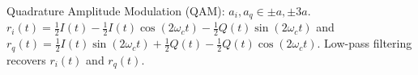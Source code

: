 \documentclass[8pt]{extarticle}
\begin{document}
\begin{multicols*}{3}
\begin{center}
Quadrature Amplitude Modulation (QAM): \( a_i, a_q \in \pm a, \pm 3a \). \( r_i(t) = \frac{1}{2}I(t) - \frac{1}{2}I(t)\cos{\left( 2\omega_c t \right)} - \frac{1}{2}Q(t)\sin{\left( 2\omega_c t \right)} \) and \( r_q(t) = \frac{1}{2}I(t)\sin{\left( 2\omega_c t \right)} + \frac{1}{2}Q(t) - \frac{1}{2}Q(t)\cos{\left( 2\omega_c t \right)} \). Low-pass filtering recovers \( r_i(t) \) and \( r_q(t) \). \\

\end{center}
\end{multicols*}
\end{document}
